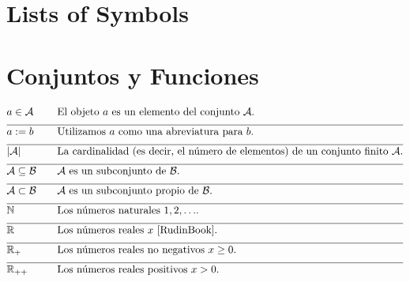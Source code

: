 
\section*{Lists of Symbols}

\vspace*{-2mm}
\section*{Conjuntos y Funciones} 

\begin{align} 
	&a \in \mathcal{A} & \quad & \parbox{.75\textwidth}{El objeto $a$ es un elemento del conjunto $\mathcal{A}$.} \nonumber \\[2mm] \hline \nonumber\\[-5mm]
	&a \defeq b & \quad & \mbox{Utilizamos $a$ como una abreviatura para $b$.}\nonumber \\[2mm] \hline \nonumber\\[-5mm]
	&|\mathcal{A}| & \quad & \mbox{La cardinalidad (es decir, el número de elementos) de un conjunto finito $\mathcal{A}$.}\nonumber \\[2mm] \hline \nonumber\\[-5mm]
	&\mathcal{A} \subseteq \mathcal{B}& \quad & \mbox{$\mathcal{A}$ es un subconjunto de $\mathcal{B}$.}\nonumber \\[2mm] \hline \nonumber\\[-5mm]
	&\mathcal{A} \subset \mathcal{B}& \quad & \mbox{$\mathcal{A}$ es un subconjunto propio de $\mathcal{B}$.} \nonumber \\[2mm] \hline \nonumber\\[-5mm]
	&\mathbb{N} & \quad & \mbox{Los números naturales $1,2,\ldots$.}\nonumber \\[2mm] \hline \nonumber\\[-5mm]
	&\mathbb{R}  &\quad &\mbox{Los números reales $x$ \cite{RudinBook}.} \nonumber \\[2mm] \hline \nonumber\\[-5mm]
	&\mathbb{R}_{+}  &\quad &\mbox{Los números reales no negativos $x\geq0$.}\nonumber \\[2mm] \hline \nonumber\\[-5mm]
	&\mathbb{R}_{++}  &\quad &\mbox{Los números reales positivos $x> 0$.} \nonumber
\end{align} 

